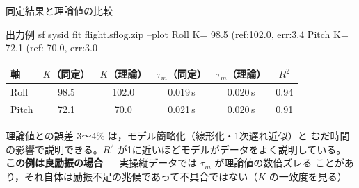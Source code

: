 \begin{frame}[fragile]{同定結果と理論値の比較}
  \begin{sflisting}[basicstyle=\ttfamily\scriptsize]{出力例}
sf sysid fit flight.sflog.zip --plot
  Roll  K= 98.5 (ref:102.0, err:3.4%
  Pitch K= 72.1 (ref: 70.0, err:3.0%
  \end{sflisting}

  \vspace{0.3em}

  \begin{table}
    \centering\footnotesize
    \begin{tabular}{lccccc}
      \hline
      \textbf{軸} & \textbf{$K$（同定）} & \textbf{$K$（理論）} & \textbf{$\tau_m$（同定）} & \textbf{$\tau_m$（理論）} & \textbf{$R^2$} \\
      \hline
      Roll  & 98.5 & 102.0 & 0.019\,s & 0.020\,s & 0.94 \\
      Pitch & 72.1 &  70.0 & 0.021\,s & 0.020\,s & 0.91 \\
      \hline
    \end{tabular}
  \end{table}

  \vspace{0.3em}

  {\footnotesize 理論値との誤差 3〜4\% は，モデル簡略化（線形化・1次遅れ近似）と
  むだ時間の影響で説明できる。$R^2$ が1に近いほどモデルがデータをよく説明している。
  \textbf{この例は良励振の場合} — 実操縦データでは $\tau_m$ が理論値の数倍ズレる
  ことがあり，それ自体は励振不足の兆候であって不具合ではない（$K$ の一致度を見る）}
\end{frame}


